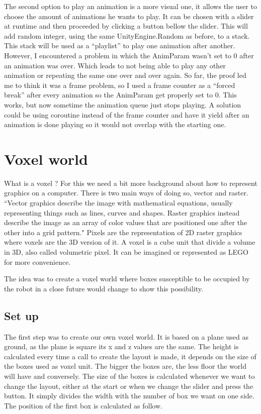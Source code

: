 \documentclass{scrartcl}
\begin{document}
The second option to play an animation is a more visual one, it allows the user to choose the amount of animations he wants to play. 
It can be chosen with a slider at runtime and then proceeded by clicking a button bellow the slider. 
This will add random integer, using the same UnityEngine.Random as before, to a stack. This stack will be used as a “playlist” to play one animation after another. 
However, I encountered a problem in which the AnimParam wasn’t set to 0 after an animation was over. 
Which leads to not being able to play any other animation or repeating the same one over and over again. 
So far, the proof led me to think it was a frame problem, so I used a frame counter as a “forced break” after every animation so the AnimParam get properly set to 0. 
This works, but now sometime the animation queue just stops playing. A solution could be using coroutine instead of the frame counter 
and have it yield after an animation is done playing so it would not overlap with the starting one.


\clearpage

\section{Voxel world}

What is a voxel ? For this we need a bit more background about how to represent graphics on a computer. 
There is two main ways of doing so, vector and raster. 
“Vector graphics describe the image with mathematical equations, usually representing things such as lines, curves and shapes. 
Raster graphics instead describe the image as an array of color values that are positioned one after the other into a grid pattern."
Pixels are the representation of 2D raster graphics where voxels are the 3D version of it. 
A voxel is a cube unit that divide a volume in 3D, also called volumetric pixel. It can be imagined or represented as LEGO for more convenience.

The idea was to create a voxel world where boxes susceptible to be occupied by the robot in a close future would change to show this possibility.

\subsection{Set up}

The first step was to create our own voxel world. It is based on a plane used as ground, as the plane is square its x and z values are the same. 
The height is calculated every time a call to create the layout is made, it depends on the size of the boxes used as voxel unit. 
The bigger the boxes are, the less floor the world will have and conversely. The size of the boxes is calculated whenever we want to change the layout, 
either at the start or when we change the slider and press the button. It simply divides the width with the number of box we want on one side. 
The position of the first box is calculated as follow.
\end{document}
